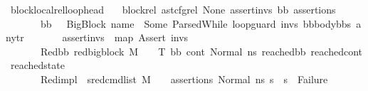 \begin{isabellebody}
\begin{isamarkuptext}
\end{isamarkuptext}\isamarkuptrue%
\isamarkupfalse%
\ block{\isacharunderscore}{\kern0pt}local{\isacharunderscore}{\kern0pt}rel{\isacharunderscore}{\kern0pt}loop{\isacharunderscore}{\kern0pt}head{\isacharcolon}{\kern0pt}\isanewline
\ \ \ block{\isacharunderscore}{\kern0pt}rel{\isacharcolon}{\kern0pt}\ {\isachardoublequoteopen}ast{\isacharunderscore}{\kern0pt}cfg{\isacharunderscore}{\kern0pt}rel\ None\ assert{\isacharunderscore}{\kern0pt}invs\ bb\ assertions{\isachardoublequoteclose}\isanewline
\ \ \ \ \ \ \ {\isachardoublequoteopen}bb\ {\isacharequal}{\kern0pt}\ \ {\isacharparenleft}{\kern0pt}BigBlock\ name\ {\isacharbrackleft}{\kern0pt}{\isacharbrackright}{\kern0pt}\ {\isacharparenleft}{\kern0pt}Some\ {\isacharparenleft}{\kern0pt}ParsedWhile\ loop{\isacharunderscore}{\kern0pt}guard\ invs\ {\isacharparenleft}{\kern0pt}bb{}{\isacharhash}{\kern0pt}body{\isacharunderscore}{\kern0pt}bbs{\isacharparenright}{\kern0pt}{\isacharparenright}{\kern0pt}{\isacharparenright}{\kern0pt}\ any{\isacharunderscore}{\kern0pt}tr{\isacharparenright}{\kern0pt}{\isachardoublequoteclose}\isanewline
\ \ \ \ \ \ \ {\isachardoublequoteopen}assert{\isacharunderscore}{\kern0pt}invs\ {\isacharequal}{\kern0pt}\ map\ Assert\ invs{\isachardoublequoteclose}\isanewline
\ \ \ \ \ \ \ Red{\isacharunderscore}{\kern0pt}bb{\isacharcolon}{\kern0pt}\ {\isachardoublequoteopen}red{\isacharunderscore}{\kern0pt}bigblock\ M\ {\isasymLambda}\ {\isasymGamma}\ {\isasymOmega}\ T\ {\isacharparenleft}{\kern0pt}bb{\isacharcomma}{\kern0pt}\ cont{}{\isacharcomma}{\kern0pt}\ {\isacharparenleft}{\kern0pt}Normal\ ns{}{\isacharparenright}{\kern0pt}{\isacharparenright}{\kern0pt}\ {\isacharparenleft}{\kern0pt}reached{\isacharunderscore}{\kern0pt}bb{\isacharcomma}{\kern0pt}\ reached{\isacharunderscore}{\kern0pt}cont{\isacharcomma}{\kern0pt}\ reached{\isacharunderscore}{\kern0pt}state{\isacharparenright}{\kern0pt}{\isachardoublequoteclose}\ \isanewline
\ \ \ \ \ \ \ Red{\isacharunderscore}{\kern0pt}impl{\isacharcolon}{\kern0pt}\ {\isachardoublequoteopen}{\isacharparenleft}{\kern0pt}{\isasymAnd}\ s{}{\isacharprime}{\kern0pt}{\isachardot}{\kern0pt}{\isacharparenleft}{\kern0pt}{\isacharparenleft}{\kern0pt}red{\isacharunderscore}{\kern0pt}cmd{\isacharunderscore}{\kern0pt}list\ M\ {\isasymLambda}\ {\isasymGamma}\ {\isasymOmega}\ assertions\ {\isacharparenleft}{\kern0pt}Normal\ ns{}{\isacharparenright}{\kern0pt}\ s{}{\isacharprime}{\kern0pt}{\isacharparenright}{\kern0pt}\ {\isasymLongrightarrow}\ {\isacharparenleft}{\kern0pt}s{}{\isacharprime}{\kern0pt}\ {\isasymnoteq}\ Failure{\isacharparenright}{\kern0pt}{\isacharparenright}{\kern0pt}{\isacharparenright}{\kern0pt}{\isachardoublequoteclose}\isanewline

\end{isabellebody}
